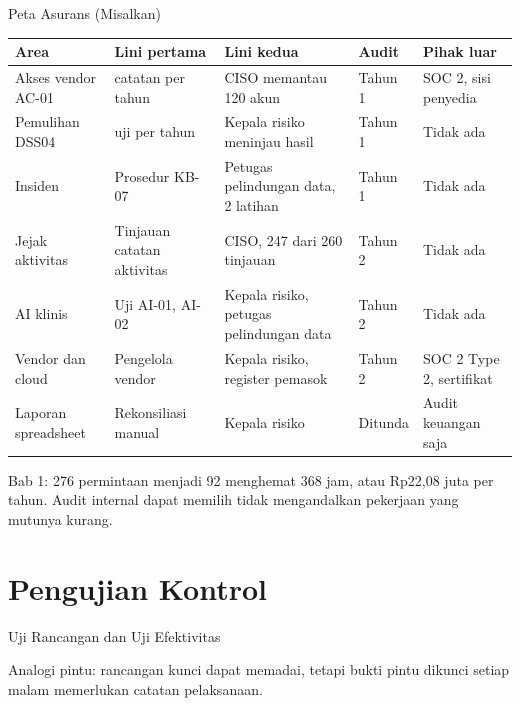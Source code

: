 \documentclass[aspectratio=169, table, 12pt]{beamer}
\begin{document}
\begin{frame}{{\Large Peta Asurans (Misalkan)}}
  \vspace{0pt}
  \scriptsize
  \begin{tabularx}{\textwidth}{|>{\raggedright\arraybackslash}p{}|>{\raggedright\arraybackslash}X|>{\raggedright\arraybackslash}X|>{\raggedright\arraybackslash}p{}|>{\raggedright\arraybackslash}p{}|}
    \hline
    \textbf{Area} & \textbf{Lini pertama} & \textbf{Lini kedua} & \textbf{Audit} &
    \textbf{Pihak luar} \\ \hline
    Akses vendor AC-01 & 60 catatan per tahun & CISO memantau 120 akun & Tahun 1 & SOC 2, sisi
    penyedia \\ \hline
    Pemulihan DSS04 & 144 uji per tahun & Kepala risiko meninjau hasil & Tahun 1 & Tidak ada \\
    \hline
    Insiden & Prosedur KB-07 & Petugas pelindungan data, 2 latihan & Tahun 1 & Tidak ada \\ \hline
    Jejak aktivitas & Tinjauan catatan aktivitas & CISO, 247 dari 260 tinjauan & Tahun 2 & Tidak
    ada \\ \hline
    AI klinis & Uji AI-01, AI-02 & Kepala risiko, petugas pelindungan data & Tahun 2 & Tidak ada \\
    \hline
    Vendor dan cloud & Pengelola vendor & Kepala risiko, register pemasok & Tahun 2 & SOC 2 Type 2,
    sertifikat \\ \hline
    Laporan spreadsheet & Rekonsiliasi manual & Kepala risiko & Ditunda & Audit keuangan saja \\
    \hline
  \end{tabularx}

  \vspace{4pt}
  \scriptsize Bab 1: 276 permintaan menjadi 92 menghemat 368 jam, atau Rp22,08 juta per tahun. Audit
  internal dapat memilih tidak mengandalkan pekerjaan yang mutunya kurang.
\end{frame}

\section{Pengujian Kontrol}

\begin{frame}{{\Large Uji Rancangan dan Uji Efektivitas}}
  \vspace{0pt}
  \begin{center}
    \resizebox{0.8\textwidth}{!}{}
  \end{center}
  \vspace{-4pt}
  \scriptsize Analogi pintu: rancangan kunci dapat memadai, tetapi bukti pintu dikunci setiap malam
  memerlukan catatan pelaksanaan.
\end{frame}
\end{document}
